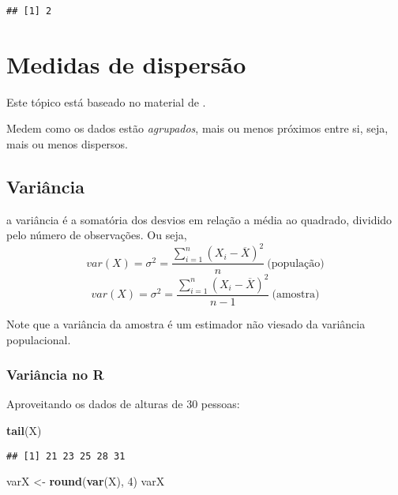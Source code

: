 \documentclass[
]{book}
\newenvironment{Shaded}{\begin{snugshade}}{\end{snugshade}}
\newcommand{\DecValTok}[1]{\textcolor[rgb]{0.00,0.00,0.81}{#1}}
\newcommand{\KeywordTok}[1]{\textcolor[rgb]{0.13,0.29,0.53}{\textbf{#1}}}
\newcommand{\NormalTok}[1]{#1}
\newcommand{\StringTok}[1]{\textcolor[rgb]{0.31,0.60,0.02}{#1}}
\begin{document}
\begin{verbatim}
## [1] 2
\end{verbatim}

\hypertarget{medidas-de-dispersuxe3o}{%
\chapter{Medidas de dispersão}\label{medidas-de-dispersuxe3o}}

Este tópico está baseado no material de \citet{Sartoris2013}.

Medem como os dados estão \textit{agrupados}, mais ou menos próximos entre si,
seja, mais ou menos dispersos.

\hypertarget{variuxe2ncia}{%
\section{Variância}\label{variuxe2ncia}}

a variância é a somatória dos desvios em relação a média ao quadrado, dividido pelo
número de observações. Ou seja,
\begin{equation*}
  var(X) =\sigma^2 = \frac{\sum_{i=1}^{n}(X_i - \overline{X})^2}{n}~\text{(população)}
\end{equation*}
\begin{equation*}
  var(X) =\sigma^2 = \frac{\sum_{i=1}^{n}(X_i - \overline{X})^2}{n-1}~\text{(amostra)}
\end{equation*}

Note que a variância da amostra é um estimador não viesado da variância populacional.

\hypertarget{variuxe2ncia-no-r}{%
\subsection{Variância no R}\label{variuxe2ncia-no-r}}

Aproveitando os dados de alturas de 30 pessoas:

\begin{Shaded}
\begin{Highlighting}[]
\KeywordTok{tail}\NormalTok{(X)}
\end{Highlighting}
\end{Shaded}

\begin{verbatim}
## [1] 21 23 25 28 31
\end{verbatim}

\begin{Shaded}
\begin{Highlighting}[]
\NormalTok{varX <-}\StringTok{ }\KeywordTok{round}\NormalTok{(}\KeywordTok{var}\NormalTok{(X), }\DecValTok{4}\NormalTok{)}
\NormalTok{varX}
\end{Highlighting}
\end{Shaded}
\end{document}
